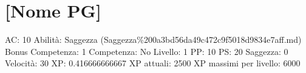 \section{{[}Nome PG{]}}\label{nome-pg}

AC: 10 Abilità: Saggezza
(Saggezza\%200a3bd56da49c472c9f5018d9834e7aff.md) Bonus Competenza: 1
Competenza: No Livello: 1 PP: 10 PS: 20 Saggezza: 0 Velocità: 30 XP:
0.416666666667 XP attuali: 2500 XP massimi per livello: 6000
